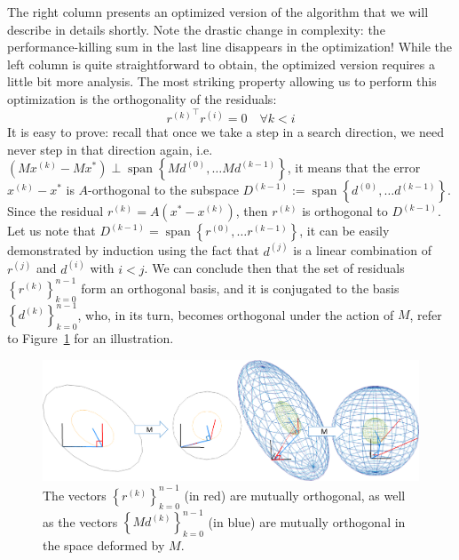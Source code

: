 \documentclass[notitlepage,oneside]{book}
\DeclareMathOperator{\Span}{span}
\begin{document}
The right column presents an optimized version of the algorithm that we will describe in details shortly.
Note the drastic change in complexity: the performance-killing sum in the last line disappears in the optimization!
While the left column is quite straightforward to obtain, the optimized version requires a little bit more analysis.
The most striking property allowing us to perform this optimization is the orthogonality of the residuals:
$$
\boxed{{r^{(k)}}^\top r^{(i)}=0 \quad \forall k<i}
$$
It is easy to prove: recall that once we take a step in a search direction, we need never step in that direction again, i.e.
$\left(Mx^{(k)} - Mx^*\right) \perp \Span\left\{Md^{(0)}, \dots Md^{(k-1)}\right\}$, it means that the error $x^{(k)} - x^*$ is $A$-orthogonal to the subspace $D^{(k-1)}:=\Span\left\{d^{(0)}, \dots d^{(k-1)}\right\}$.
Since the residual $r^{(k)} = A\left(x^*-x^{(k)}\right)$, then $r^{(k)}$ is orthogonal to $D^{(k-1)}$.
Let us note that $D^{(k-1)} = \Span\left\{r^{(0)}, \dots r^{(k-1)}\right\}$, it can be easily demonstrated by induction using the fact that $d^{(j)}$ is
a linear combination of $r^{(j)}$ and $d^{(i)}$ with $i<j$.
We can conclude then that the set of residuals $\left\{r^{(k)}\right\}_{k=0}^{n-1}$ form an orthogonal basis,
and it is conjugated to the basis $\left\{d^{(k)}\right\}_{k=0}^{n-1}$, who, in its turn, becomes orthogonal under the action of $M$, refer to Figure~\ref{fig:conjuge} for an illustration.

\begin{figure}[t]
  \centering
  \includegraphics[width=1\linewidth]{img/cg/conjuge.png}
  \caption{The vectors $\left\{r^{(k)}\right\}_{k=0}^{n-1}$ (in red) are mutually orthogonal, as well as
  the vectors $\left\{Md^{(k)}\right\}_{k=0}^{n-1}$ (in blue) are mutually orthogonal in the space deformed by $M$.}
  \label{fig:conjuge}
\end{figure}
\end{document}
